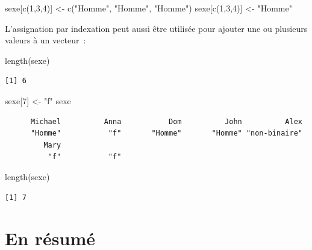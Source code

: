 \documentclass[
  letterpaper,
  DIV=11,
  numbers=noendperiod,
  oneside]{scrreprt}
\newenvironment{Shaded}{\begin{snugshade}}{\end{snugshade}}
\newcommand{\DecValTok}[1]{\textcolor[rgb]{0.68,0.00,0.00}{#1}}
\newcommand{\FunctionTok}[1]{\textcolor[rgb]{0.28,0.35,0.67}{#1}}
\newcommand{\NormalTok}[1]{\textcolor[rgb]{0.00,0.23,0.31}{#1}}
\newcommand{\OtherTok}[1]{\textcolor[rgb]{0.00,0.23,0.31}{#1}}
\newcommand{\StringTok}[1]{\textcolor[rgb]{0.13,0.47,0.30}{#1}}
\begin{document}
\begin{Shaded}
\begin{Highlighting}[]
\NormalTok{sexe[}\FunctionTok{c}\NormalTok{(}\DecValTok{1}\NormalTok{,}\DecValTok{3}\NormalTok{,}\DecValTok{4}\NormalTok{)] }\OtherTok{\textless{}{-}} \FunctionTok{c}\NormalTok{(}\StringTok{"Homme"}\NormalTok{, }\StringTok{"Homme"}\NormalTok{, }\StringTok{"Homme"}\NormalTok{)}
\NormalTok{sexe[}\FunctionTok{c}\NormalTok{(}\DecValTok{1}\NormalTok{,}\DecValTok{3}\NormalTok{,}\DecValTok{4}\NormalTok{)] }\OtherTok{\textless{}{-}} \StringTok{"Homme"}
\end{Highlighting}
\end{Shaded}

L'assignation par indexation peut aussi être utilisée pour ajouter une
ou plusieurs valeurs à un vecteur~:

\begin{Shaded}
\begin{Highlighting}[]
\FunctionTok{length}\NormalTok{(sexe)}
\end{Highlighting}
\end{Shaded}

\begin{verbatim}
[1] 6
\end{verbatim}

\begin{Shaded}
\begin{Highlighting}[]
\NormalTok{sexe[}\DecValTok{7}\NormalTok{] }\OtherTok{\textless{}{-}} \StringTok{"f"}
\NormalTok{sexe}
\end{Highlighting}
\end{Shaded}

\begin{verbatim}
      Michael          Anna           Dom          John          Alex 
      "Homme"           "f"       "Homme"       "Homme" "non-binaire" 
         Mary               
          "f"           "f" 
\end{verbatim}

\begin{Shaded}
\begin{Highlighting}[]
\FunctionTok{length}\NormalTok{(sexe)}
\end{Highlighting}
\end{Shaded}

\begin{verbatim}
[1] 7
\end{verbatim}

\hypertarget{en-ruxe9sumuxe9}{%
\section{En résumé}\label{en-ruxe9sumuxe9}}
\end{document}
